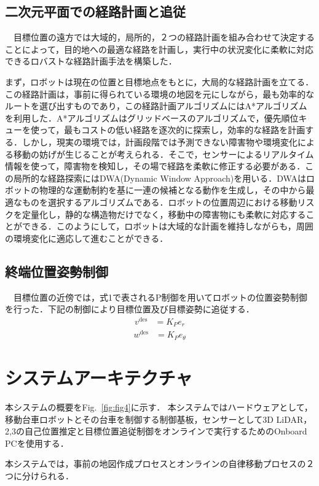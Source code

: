 \subsection{二次元平面での経路計画と追従}
　目標位置の遠方では大域的，局所的，２つの経路計画を組み合わせて決定することによって，目的地への最適な経路を計画し，実行中の状況変化に柔軟に対応できるロバストな経路計画手法を構築した．

まず，ロボットは現在の位置と目標地点をもとに，大局的な経路計画を立てる．この経路計画は，事前に得られている環境の地図を元にしながら，最も効率的なルートを選び出すものであり，この経路計画アルゴリズムにはA*アルゴリズム\cite{Astar}を利用した．A*アルゴリズムはグリッドベースのアルゴリズムで，優先順位キューを使って，最もコストの低い経路を逐次的に探索し，効率的な経路を計画する．しかし，現実の環境では，計画段階では予測できない障害物や環境変化による移動の妨げが生じることが考えられる．そこで，センサーによるリアルタイム情報を使って，障害物を検知し，その場で経路を柔軟に修正する必要がある．この局所的な経路探索にはDWA(Dynamic Window Approach)\cite{DWA}を用いる．DWAはロボットの物理的な運動制約を基に一連の候補となる動作を生成し，その中から最適なものを選択するアルゴリズムである．ロボットの位置周辺における移動リスクを定量化し，静的な構造物だけでなく，移動中の障害物にも柔軟に対応することができる．このようにして，ロボットは大域的な計画を維持しながらも，周囲の環境変化に適応して進むことができる．

\subsection{終端位置姿勢制御}
　目標位置の近傍では，式1で表されるP制御を用いてロボットの位置姿勢制御を行った．下記の制御により目標位置及び目標姿勢に追従する．
\begin{align}
v^{\text{des}} &= K_{P} e_{r}
\end{align}
\begin{align}
w^{\text{des}} &= K_{P} e_{θ}
\end{align}

\section{システムアーキテクチャ}
本システムの概要をFig.~\ref{fig:fig4}に示す．
本システムではハードウェアとして，移動台車ロボットとその台車を制御する制御基板，センサーとして3D LiDAR，2,3の自己位置推定と目標位置追従制御をオンラインで実行するためのOnboard PCを使用する．

本システムでは，事前の地図作成プロセスとオンラインの自律移動プロセスの２つに分けられる．

